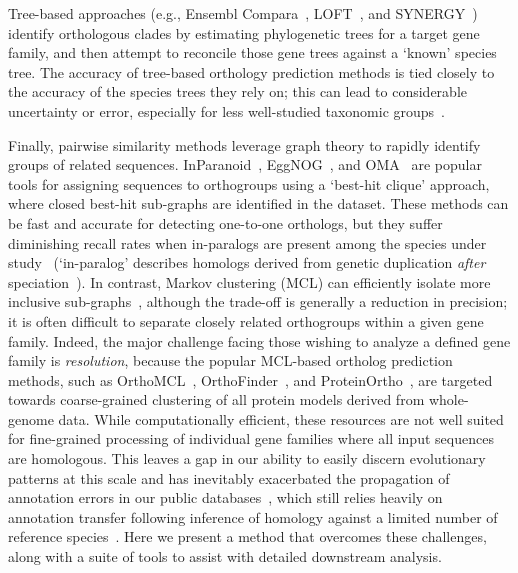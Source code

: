 \documentclass[twocolumn]{bmcart}%
\begin{document}
Tree-based approaches (e.g., Ensembl Compara~\cite{Vilella:2009ju}, LOFT~\cite{vanderHeijden:2007bo}, and SYNERGY~\cite{Wapinski:2007fa}) identify orthologous clades by estimating phylogenetic trees for a target gene family, and then attempt to reconcile those gene trees against a `known' species tree.
The accuracy of tree-based orthology prediction methods is tied closely to the accuracy of the species trees they rely on;
this can lead to considerable uncertainty or error, especially for less well-studied taxonomic groups~\cite{Xu:2016ek}.

Finally, pairwise similarity methods leverage graph theory to rapidly identify groups of related sequences.
InParanoid~\cite{OBrien:2005cy}, EggNOG~\cite{Jensen:2007cc}, and OMA~\cite{Roth:2009iu} are popular tools for assigning sequences to orthogroups using a `best-hit clique' approach, where closed best-hit sub-graphs are identified in the dataset.
These methods can be fast and accurate for detecting one-to-one orthologs, but they suffer diminishing recall rates when in-paralogs are present among the species under study~\cite{Dalquen:2013fz} (`in-paralog' describes homologs derived from genetic duplication \textit{after} speciation~\cite{Sonnhammer:2002vm,Tekaia:2016ga}).
In contrast, Markov clustering (MCL) can efficiently isolate more inclusive sub-graphs~\cite{VanDongen:kJZ890qx,Enright:2002uq}, although the trade-off is generally a reduction in precision;
it is often difficult to separate closely related orthogroups within a given gene family.
Indeed, the major challenge facing those wishing to analyze a defined gene family is \textit{resolution}, because the popular MCL-based ortholog prediction methods, such as OrthoMCL~\cite{Li:2003en}, OrthoFinder~\cite{Emms:2015ig}, and ProteinOrtho~\cite{Lechner:2011jk}, are targeted towards coarse-grained clustering of all protein models derived from whole-genome data.
While computationally efficient, these resources are not well suited for fine-grained processing of individual gene families where all input sequences are homologous.
This leaves a gap in our ability to easily discern evolutionary patterns at this scale and has inevitably exacerbated the propagation of annotation errors in our public databases~\cite{Schnoes:2009gb}, which still relies heavily on annotation transfer following inference of homology against a limited number of reference species~\cite{Aken:2016dl, Mi:2016bw, OLeary:2016cm}.
Here we present a method that overcomes these challenges, along with a suite of tools to assist with detailed downstream analysis.
\end{document}
